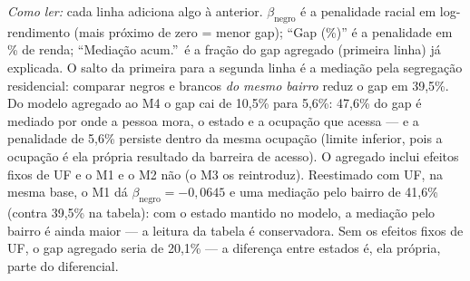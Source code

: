 \begin{table}[!ht]
\centering
\caption{Decomposição do gap salarial racial por mediação contextual e ocupacional
(HLM de dois níveis, indivíduos em UPA, com efeitos fixos de UF; PNAD Contínua
2016--2025, população completa). Cada linha
acrescenta um bloco de controles ao anterior; à medida que se adiciona contexto e ocupação,
o gap encolhe e a mediação acumulada cresce.}
\label{tab:mediacao}
\par\smallskip
\footnotesize\emph{Como ler:} cada linha adiciona algo à anterior. $\beta_{\text{negro}}$
é a penalidade racial em log-rendimento (mais próximo de zero = menor gap); ``Gap (\%)'' é a
penalidade em \% de renda; ``Mediação acum.''\ é a fração do gap agregado (primeira linha) já
explicada. O salto da primeira para a segunda linha é a mediação pela segregação residencial:
comparar negros e brancos \emph{do mesmo bairro} reduz o gap em 39,5\%. Do modelo agregado
ao M4 o gap cai de 10,5\% para 5,6\%: 47,6\% do gap é mediado por
onde a pessoa mora, o estado e a ocupação que acessa --- e a penalidade de 5,6\% persiste
dentro da mesma ocupação (limite inferior, pois a ocupação é ela própria resultado da barreira de acesso). O agregado inclui efeitos fixos de UF e o M1 e o M2 não (o M3 os reintroduz). Reestimado com UF, na mesma base, o M1 dá $\beta_{\text{negro}} = −0{,}0645$ e uma mediação pelo bairro de 41,6\% (contra 39,5\% na tabela): com o estado mantido no modelo, a mediação pelo bairro é ainda maior --- a leitura da tabela é conservadora. Sem os efeitos fixos de UF, o gap agregado seria de 20,1\% --- a diferença entre estados é, ela própria, parte do diferencial.
\end{table}
